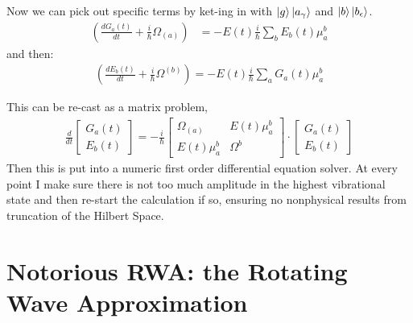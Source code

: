 Now we can pick out specific terms by ket-ing in with $\ket{g}\ket{a_{\gamma}}$ and $\ket{b}\ket{b_{\epsilon}}$.
\begin{align*}
	\left(\frac{d G_a(t)}{dt} + \frac{i}{\hbar}\Omega_{(a)}\right) &=-E(t)\frac{i}{\hbar}  \sum_{b} E_b(t) \mu_{a}^{b}
\end{align*}
and then:
\begin{align*}
	\left(\frac{d E_b(t)}{dt} + \frac{i}{\hbar} \Omega^{(b)} \right) =-E(t)\frac{i}{\hbar} \sum_{a} G_a(t) \mu_{a}^{b}
\end{align*}

This can be re-cast as a matrix problem,
\begin{align*}
	\frac{d}{dt}\begin{bmatrix}
		G_a(t) \\
		E_b(t)
	\end{bmatrix}
	= -\frac{i}{\hbar}
	\begin{bmatrix}
		\Omega_{(a)} & E(t) \mu_{a}^{b} \\
		E(t) \mu_{a}^{b} & \Omega^{b}
	\end{bmatrix}
	\cdot
	\begin{bmatrix}
		G_a(t) \\
		E_b(t)
	\end{bmatrix}
\end{align*}
Then this is put into a numeric first order differential equation solver.  At every point I make sure there is not too much amplitude in the highest vibrational state and then re-start the calculation if so, ensuring no nonphysical results from truncation of the Hilbert Space.

\section{Notorious RWA: the Rotating Wave Approximation}

